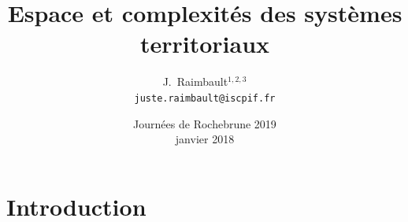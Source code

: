 \documentclass[english,11pt,usenames,dvipsnames]{beamer}
\begin{document}
\title{Espace et complexités des systèmes territoriaux}

\author{J.~Raimbault$^{1,2,3}$\\
\texttt{juste.raimbault@iscpif.fr}
}




\date{Journées de Rochebrune 2019\\ janvier 2018
}

\frame{\maketitle}





\section{Introduction}

\end{document}

